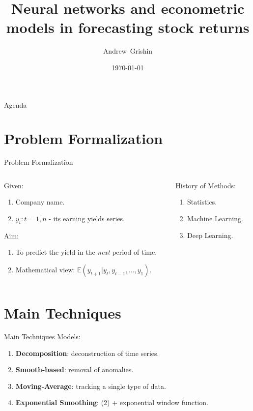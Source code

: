 \documentclass[aspectratio= 169]{beamer}
\title[Stock returns forecasting]{Neural networks and econometric models in forecasting stock returns}
\author{Andrew~Grishin}
\institute[Faculty of Economics MSU]{Faculty of Economics Moscow State University}
\date{\today}
\begin{document}
	
	\begin{frame}
		\titlepage
	\end{frame}

	\begin{frame}{Agenda}
		\tableofcontents
	\end{frame}

	\section{Problem Formalization}
	\begin{frame}{Problem Formalization}
		
		\begin{columns}[T]
			\begin{column}{.59\textwidth}
				
					Given:
					\begin{enumerate}
						\item Company name.
						\item ${y_t: t = \overline{1, n}}$ - its earning yields series.
					\end{enumerate}
					Aim:
					\begin{enumerate}
						\item To predict the yield in the \textit{next} period of time. 
						\item Mathematical view: ${\mathbb{E} \left(y_{t+1} | y_t, y_{t - 1}, ..., y_1 \right)}$.
					\end{enumerate}
					
				\end{column}%
				\hfill%
				\begin{column}{.32\textwidth}
					History of Methods:
						\begin{enumerate}
							\item Statistics.
							\item Machine Learning.
							\item Deep Learning.
						\end{enumerate}
				\end{column}
			
			\end{columns}

	\end{frame}

	\section{Main Techniques}
	\begin{frame}{Main Techniques}
		Models:
		\begin{enumerate}
			\item \textbf{Decomposition}: deconstruction of time series.
			\item \textbf{Smooth-based}: removal of anomalies.
			\item \textbf{Moving-Average}: tracking a single type of data.
			\item \textbf{Exponential Smoothing}: (2) + exponential window function.
		\end{enumerate}
	\end{frame}
\end{document}
